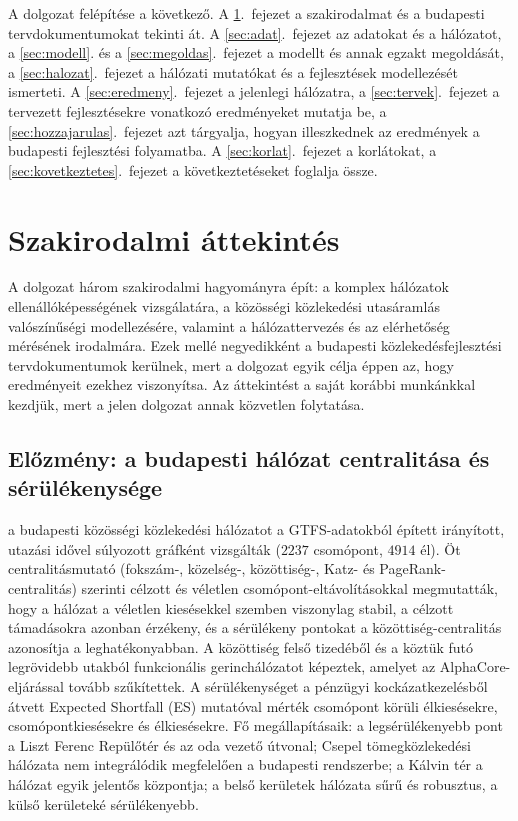 \documentclass[12pt,a4paper]{article}
\theoremstyle{definition}
\theoremstyle{remark}
\begin{document}
A dolgozat felépítése a következő. A \ref{sec:irodalom}.~fejezet a
szakirodalmat és a budapesti tervdokumentumokat tekinti át. A
\ref{sec:adat}.~fejezet az adatokat és a hálózatot, a \ref{sec:modell}. és a
\ref{sec:megoldas}.~fejezet a modellt és annak egzakt megoldását, a
\ref{sec:halozat}.~fejezet a hálózati mutatókat és a fejlesztések
modellezését ismerteti. A \ref{sec:eredmeny}.~fejezet a jelenlegi hálózatra,
a \ref{sec:tervek}.~fejezet a tervezett fejlesztésekre vonatkozó eredményeket
mutatja be, a \ref{sec:hozzajarulas}.~fejezet azt tárgyalja, hogyan
illeszkednek az eredmények a budapesti fejlesztési folyamatba. A
\ref{sec:korlat}.~fejezet a korlátokat, a \ref{sec:kovetkeztetes}.~fejezet a
következtetéseket foglalja össze.

\section{Szakirodalmi áttekintés}
\label{sec:irodalom}

A dolgozat három szakirodalmi hagyományra épít: a komplex hálózatok
ellenállóképességének vizsgálatára, a közösségi közlekedési utasáramlás
valószínűségi modellezésére, valamint a hálózattervezés és az elérhetőség
mérésének irodalmára. Ezek mellé negyedikként a budapesti
közlekedésfejlesztési tervdokumentumok kerülnek, mert a dolgozat egyik célja
éppen az, hogy eredményeit ezekhez viszonyítsa. Az áttekintést a saját korábbi
munkánkkal kezdjük, mert a jelen dolgozat annak közvetlen folytatása.

\subsection{Előzmény: a budapesti hálózat centralitása és sérülékenysége}

\citet{molnar2026} a budapesti közösségi közlekedési hálózatot a GTFS-adatokból
épített irányított, utazási idővel súlyozott gráfként vizsgálták
($2237$ csomópont, $4914$ él). Öt centralitásmutató (fokszám-, közelség-,
közöttiség-, Katz- és PageRank-centralitás) szerinti célzott és véletlen
csomópont-eltávolításokkal megmutatták, hogy a hálózat a véletlen
kiesésekkel szemben viszonylag stabil, a célzott támadásokra azonban
érzékeny, és a sérülékeny pontokat a közöttiség-centralitás azonosítja a
leghatékonyabban. A közöttiség felső tizedéből és a köztük futó legrövidebb
utakból funkcionális gerinchálózatot képeztek, amelyet az AlphaCore-eljárással
\citep{zhu2024} tovább szűkítettek. A sérülékenységet a pénzügyi
kockázatkezelésből átvett Expected Shortfall (ES) mutatóval mérték
csomópont körüli élkiesésekre, csomópontkiesésekre és élkiesésekre.
Fő megállapításaik: a legsérülékenyebb pont a Liszt Ferenc Repülőtér és az
oda vezető útvonal; Csepel tömegközlekedési hálózata nem integrálódik
megfelelően a budapesti rendszerbe; a Kálvin tér a hálózat egyik jelentős
központja; a belső kerületek hálózata sűrű és robusztus, a külső kerületeké
sérülékenyebb.
\end{document}
